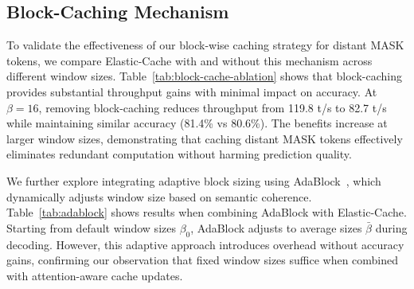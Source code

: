 \documentclass{article} %
\theoremstyle{definition}
\theoremstyle{remark}
\begin{document}
\subsection{Block-Caching Mechanism}

To validate the effectiveness of our block-wise caching strategy for distant MASK tokens, we compare Elastic-Cache with and without this mechanism across different window sizes. Table~\ref{tab:block-cache-ablation} shows that block-caching provides substantial throughput gains with minimal impact on accuracy. At $\beta=16$, removing block-caching reduces throughput from 119.8 t/s to 82.7 t/s while maintaining similar accuracy (81.4\% vs 80.6\%). The benefits increase at larger window sizes, demonstrating that caching distant MASK tokens effectively eliminates redundant computation without harming prediction quality.

\begin{table}[h]
\centering
\caption{Ablation of block-caching mechanism on GSM8K with 512 Gen Length (LLaDA-1.5, $\gamma=0.9$). Each cell shows accuracy (top) and throughput in t/s (bottom).}
\label{tab:block-cache-ablation}
\vspace{-0.1in}
\end{table}

We further explore integrating adaptive block sizing using AdaBlock~\citep{lu2025adablock}, which dynamically adjusts window size based on semantic coherence. Table~\ref{tab:adablock} shows results when combining AdaBlock with Elastic-Cache. Starting from default window sizes $\beta_0$, AdaBlock adjusts to average sizes $\bar{\beta}$ during decoding. However, this adaptive approach introduces overhead without accuracy gains, confirming our observation that fixed window sizes suffice when combined with attention-aware cache updates.
\end{document}
